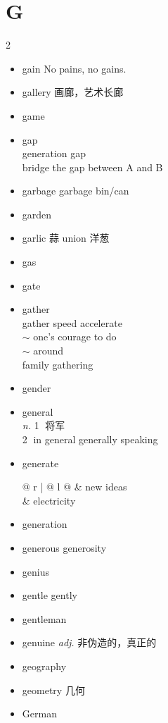 \documentclass[../../book.tex]{subfiles}
\begin{document}
\section{G}
\raggedcolumns
\begin{multicols}{2}
\begin{itemize}
\item[-] gain \phantom{a} No pains, no gains.
\item[-] gallery 画廊，艺术长廊
\item[-] game
\item[-] gap
\\generation gap
\\bridge the gap between A and B
\item[-] garbage \phantom{a} garbage bin/can
\item[-] garden
\item[-] garlic 蒜 \phantom{a} union 洋葱
\item[-] gas
\item[-] gate
\item[-] gather
\\gather speed \phantom{a} accelerate
\\$\sim$ one\textquoteright s courage to do
\\$\sim$ around
\\family gathering
\item[-] gender
\item[-] general
\\\emph{n.} \textcircled{1} 将军
\\\textcircled{2} in general \phantom{a} generally speaking
\item[-] generate
\\\begin{tabular}{@{} r | @{\hspace{0.1em}} l @{}}
 & new ideas
\\& electricity
\end{tabular}
\item[-] generation
\item[-] generous \phantom{a} generosity
\item[-] genius
\item[-] gentle \phantom{a} gently
\item[-] gentleman
\item[-] genuine \emph{adj.} 非伪造的，真正的
\item[-] geography
\item[-] geometry 几何
\item[-] German

\end{itemize}
\end{multicols}
\end{document}
